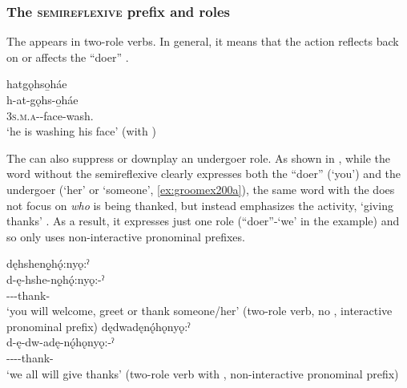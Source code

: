 \subsubsection*{The \textsc{semireflexive} prefix and roles} \label{The semireflexive prefix and roles}
The  \textsc{\semireflexive} appears in two-role verbs. In general, it means that the action reflects back on or affects the “doer” .

\ea\label{ex:groomex100} 
hatgǫhso̱háe\\
\gll h-at-gǫhs-o̱háe\\
\textsc{3s.m.a}-{\semireflexive}-face-wash.{\stative}\\
\glt ‘he is washing his face’ (with \textsc{\semireflexive})

\z


The  \textsc{\semireflexive} can also suppress or downplay an undergoer role. As shown in , while the word without the semireflexive clearly expresses both the “doer” (‘you’) and the undergoer (‘her’ or ‘someone’, \ref{ex:groomex200a}), the same word with the  \textsc{\semireflexive} does not focus on \emph{who} is being thanked, but instead emphasizes the activity, ‘giving thanks’ . As a result, it expresses just one role (“doer”-‘we’ in the example) and so only uses non-interactive pronominal prefixes.

\ea\label{ex:groomex200}
\ea dęhshenǫ̱hǫ́:nyǫ:ˀ \\\label{ex:groomex200a}
\gll d-ę-hshe-nǫ̱hǫ́:nyǫ:-ˀ\\
{\dualic}-{\future}--thank-\exsc{\punctual }\\
\glt ‘you will welcome, greet or thank someone/her’ (two-role verb, no {\semireflexive}, interactive pronominal prefix)
\ex dędwadęnǫ́hǫnyǫ:ˀ \\\label{ex:groomex200b}
\gll d-ę-dw-adę-nǫ́hǫnyǫ:-ˀ \\
{\dualic}-{\future}--{\semireflexive}-thank-{\punctual}\\
\glt ‘we all will give thanks’ (two-role verb with {\semireflexive}, non-interactive pronominal prefix)
\z
\z

